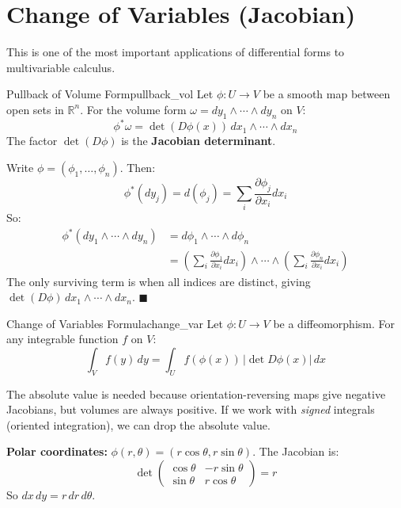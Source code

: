 \documentclass[11pt, letterpaper, openany]{book}
\renewenvironment{proof}[1][\proofname]{%
  \tcolorbox[blanker, breakable, left=1em,
    before skip=1em, after skip=1em,
    borderline west={2pt}{0pt}{MagicTeal!50},
    colback=MagicCream,
    before upper={\textcolor{MagicTeal}{\sffamily\bfseries #1.}\space}
  ]%
}{%
  \hfill\textcolor{MagicTeal}{\ensuremath{\blacksquare}}\endtcolorbox%
}
\begin{document}
\section{Change of Variables (Jacobian)}

This is one of the most important applications of differential forms to multivariable calculus.

\begin{thm}{Pullback of Volume Form}{pullback_vol}
Let $\phi: U \to V$ be a smooth map between open sets in $\mathbb{R}^n$. For the volume form $\omega = dy_1 \wedge \cdots \wedge dy_n$ on $V$:
\[\phi^* \omega = \det(D\phi(x)) \, dx_1 \wedge \cdots \wedge dx_n\]
The factor $\det(D\phi)$ is the \textbf{Jacobian determinant}.
\end{thm}

\begin{proof}
Write $\phi = (\phi_1, \ldots, \phi_n)$. Then:
\[\phi^*(dy_j) = d(\phi_j) = \sum_i \frac{\partial \phi_j}{\partial x_i} dx_i\]
So:
\begin{align*}
\phi^*(dy_1 \wedge \cdots \wedge dy_n) &= d\phi_1 \wedge \cdots \wedge d\phi_n \\
&= \left(\sum_i \frac{\partial \phi_1}{\partial x_i} dx_i\right) \wedge \cdots \wedge \left(\sum_i \frac{\partial \phi_n}{\partial x_i} dx_i\right)
\end{align*}
The only surviving term is when all indices are distinct, giving $\det(D\phi) \, dx_1 \wedge \cdots \wedge dx_n$.
\end{proof}

\begin{thm}{Change of Variables Formula}{change_var}
Let $\phi: U \to V$ be a diffeomorphism. For any integrable function $f$ on $V$:
\[\int_V f(y)\, dy = \int_U f(\phi(x)) \, |\det D\phi(x)| \, dx\]
\end{thm}

\begin{remark}
The absolute value is needed because orientation-reversing maps give negative Jacobians, but volumes are always positive. If we work with \emph{signed} integrals (oriented integration), we can drop the absolute value.
\end{remark}

\begin{example}
\textbf{Polar coordinates:} $\phi(r, \theta) = (r\cos\theta, r\sin\theta)$. The Jacobian is:
\[\det \begin{pmatrix} \cos\theta & -r\sin\theta \\ \sin\theta & r\cos\theta \end{pmatrix} = r\]
So $dx\,dy = r\,dr\,d\theta$.
\end{example}
\end{document}

